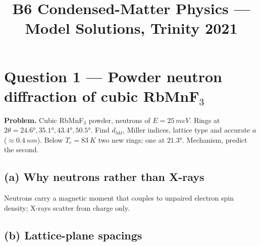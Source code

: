 \documentclass[11pt]{article}
\title{B6 Condensed-Matter Physics --- Model Solutions, Trinity 2021}
\author{}
\date{}
\begin{document}
\maketitle

\section*{Question 1 --- Powder neutron diffraction of cubic RbMnF$_3$}

\textbf{Problem.} Cubic RbMnF$_3$ powder, neutrons of $E=\SI{25}{meV}$. Rings at $2\theta=\ang{24.6},\ang{35.1},\ang{43.4},\ang{50.5}$. Find $d_{hkl}$, Miller indices, lattice type and accurate $a$ ($\approx \SI{0.4}{nm}$). Below $T_c=\SI{83}{K}$ two new rings; one at $\ang{21.3}$. Mechanism, predict the second.

\subsection*{(a) Why neutrons rather than X-rays}

Neutrons carry a magnetic moment that couples to unpaired electron spin density; X-rays scatter from charge only.

\subsection*{(b) Lattice-plane spacings}
\end{document}
